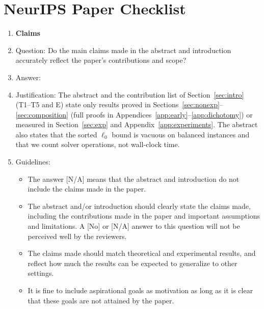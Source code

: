 \section*{NeurIPS Paper Checklist}

\begin{enumerate}

\item {\bf Claims}
    \item[] Question: Do the main claims made in the abstract and introduction accurately reflect the paper's contributions and scope?
    \item[] Answer: \answerYes{}
    \item[] Justification: The abstract and the contribution list of Section~\ref{sec:intro} (T1--T5 and E) state only results proved in Sections~\ref{sec:nonexp}--\ref{sec:composition} (full proofs in Appendices~\ref{app:early}--\ref{app:dichotomy}) or measured in Section~\ref{sec:exp} and Appendix~\ref{app:experiments}. The abstract also states that the sorted $\ell_0$ bound is vacuous on balanced instances and that we count solver operations, not wall-clock time.
    \item[] Guidelines:
    \begin{itemize}
        \item The answer [N/A] means that the abstract and introduction do not include the claims made in the paper.
        \item The abstract and/or introduction should clearly state the claims made, including the contributions made in the paper and important assumptions and limitations. A [No] or [N/A] answer to this question will not be perceived well by the reviewers.
        \item The claims made should match theoretical and experimental results, and reflect how much the results can be expected to generalize to other settings.
        \item It is fine to include aspirational goals as motivation as long as it is clear that these goals are not attained by the paper.
    \end{itemize}


\end{enumerate}
